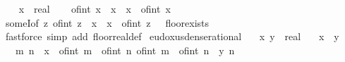 \begin{isabellebody}
\isanewline
{}\isamarkupfalse%
\isanewline
%
\isadelimproof
%
\endisadelimproof
%
\isatagproof
{}\isamarkupfalse%
\isanewline
\ \ \isamarkupfalse%
\ x\ {\isacharcolon}{\kern0pt}{\isacharcolon}{\kern0pt}\ real\isanewline
\ \ \isamarkupfalse%
\ {\isachardoublequoteopen}of{\isacharunderscore}{\kern0pt}int\ {\isasymlfloor}x{\isasymrfloor}\ {\isasymle}\ x\ {\isasymand}\ x\ {\isacharless}{\kern0pt}\ of{\isacharunderscore}{\kern0pt}int\ {\isacharparenleft}{\kern0pt}{\isasymlfloor}x{\isasymrfloor}\ {\isacharplus}{\kern0pt}\ {}{\isacharparenright}{\kern0pt}{\isachardoublequoteclose}\ \isamarkupfalse%
\ someI{\isacharbrackleft}{\kern0pt}of\ {\isachardoublequoteopen}{\isasymlambda}z{\isachardot}{\kern0pt}\ of{\isacharunderscore}{\kern0pt}int\ z\ {\isasymle}\ x\ {\isasymand}\ x\ {\isacharless}{\kern0pt}\ of{\isacharunderscore}{\kern0pt}int\ z\ {\isacharplus}{\kern0pt}\ {}{\isachardoublequoteclose}{\isacharbrackright}{\kern0pt}\ floor{\isacharunderscore}{\kern0pt}exists\ \isamarkupfalse%
\ {\isacharparenleft}{\kern0pt}fastforce\ simp\ add{\isacharcolon}{\kern0pt}\ floor{\isacharunderscore}{\kern0pt}real{\isacharunderscore}{\kern0pt}def{\isacharparenright}{\kern0pt}\isanewline
{}\isamarkupfalse%
%
\endisatagproof
{\isafoldproof}%
%
\isadelimproof
\isanewline
%
\endisadelimproof
{}\isamarkupfalse%
\isanewline
\isanewline
{}\isamarkupfalse%
\ eudoxus{\isacharunderscore}{\kern0pt}dense{\isacharunderscore}{\kern0pt}rational{\isacharcolon}{\kern0pt}\isanewline
\ \ \ x\ y\ {\isacharcolon}{\kern0pt}{\isacharcolon}{\kern0pt}\ real\isanewline
\ \ \ {\isachardoublequoteopen}x\ {\isacharless}{\kern0pt}\ y{\isachardoublequoteclose}\isanewline
\ \ \ m\ n\ \ {\isachardoublequoteopen}x\ {\isacharless}{\kern0pt}\ {\isacharparenleft}{\kern0pt}of{\isacharunderscore}{\kern0pt}int\ m\ {\isacharslash}{\kern0pt}\ of{\isacharunderscore}{\kern0pt}int\ n{\isacharparenright}{\kern0pt}{\isachardoublequoteclose}\ {\isachardoublequoteopen}{\isacharparenleft}{\kern0pt}of{\isacharunderscore}{\kern0pt}int\ m\ {\isacharslash}{\kern0pt}\ of{\isacharunderscore}{\kern0pt}int\ n{\isacharparenright}{\kern0pt}\ {\isacharless}{\kern0pt}\ y{\isachardoublequoteclose}\ {\isachardoublequoteopen}n\ {\isachargreater}{\kern0pt}\ {}{\isachardoublequoteclose}\isanewline
%
\isadelimproof
%
\endisadelimproof
%
\isatagproof
{}\isamarkupfalse%
\ {\isacharminus}{\kern0pt}\isanewline

\end{isabellebody}
